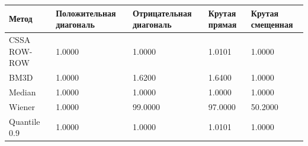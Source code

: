 \begin{tabular}{|l|l|l|l|l|}
\hline
Метод & Положительная диагональ & Отрицательная диагональ & Крутая прямая & Крутая смещенная \\
\hline
CSSA ROW-ROW & 1.0000 & 1.0000 & 1.0101 & 1.0000 \\
\hline
BM3D & 1.0000 & 1.6200 & 1.6400 & 1.0000 \\
\hline
Median & 1.0000 & 1.0000 & 1.0000 & 1.0000 \\
\hline
Wiener & 1.0000 & 99.0000 & 97.0000 & 50.2000 \\
\hline
Quantile 0.9 & 1.0000 & 1.0000 & 1.0101 & 1.0000 \\
\hline
\end{tabular}
